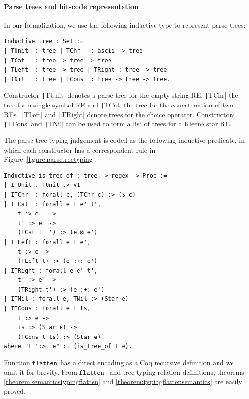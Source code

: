 \documentclass[review]{elsarticle}
\newcommand{\flatten}{\ensuremath{\texttt{flatten}}}
\newcommand{\coq}[1]{\texttt|#1|}
\theoremstyle{definition}
\begin{document}
\paragraph{Parse trees and bit-code representation}

In our formalization, we use the following inductive type to represent parse
trees:

\begin{verbatim}
Inductive tree : Set :=
| TUnit  : tree | TChr   : ascii -> tree
| TCat   : tree -> tree -> tree 
| TLeft  : tree -> tree | TRight : tree -> tree 
| TNil   : tree | TCons  : tree -> tree -> tree.
\end{verbatim}

Constructor \coq{TUnit} denotes a parse tree for the empty string RE,
\coq{TChr} the tree for a single symbol RE and \coq{TCat} the tree for
the concatenation of two REs. \coq{TLeft} and \coq{TRight} denote trees
for the choice operator. Constructors \coq{TCons} and \coq{TNil} can be
used to form a list of trees for a Kleene star RE.

The parse tree typing judgement is
coded as the following inductive predicate, in which each constructor
has a correspondent rule in Figure~\ref{figure:parsetreetyping}.

\begin{verbatim}
Inductive is_tree_of : tree -> regex -> Prop :=
| ITUnit : TUnit :> #1
| ITChr  : forall c, (TChr c) :> ($ c)
| ITCat  : forall e t e' t',
    t :> e   ->
    t' :> e' ->
    (TCat t t') :> (e @ e')
| ITLeft : forall e t e',
    t :> e ->
    (TLeft t) :> (e :+: e')
| ITRight : forall e e' t',
    t' :> e' ->
    (TRight t') :> (e :+: e')
| ITNil : forall e, TNil :> (Star e)
| ITCons : forall e t ts,
    t :> e ->
    ts :> (Star e) ->
    (TCons t ts) :> (Star e)
where "t ':>' e" := (is_tree_of t e).
\end{verbatim}
Function \flatten~has a direct encoding as a Coq recursive definition and
we omit it for brevity. From \flatten~ and tree typing relation definitions,
theorems \ref{theorem:semanticstypingflatten} and
\ref{theorem:typingflattensemantics} are easily proved.
\end{document}

